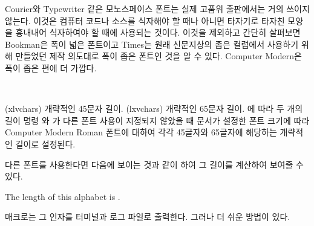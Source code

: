 Courier와 Typewriter 같은 모노스페이스 폰트는 실제 고품위 출판에서는
거의 쓰이지 않는다. 이것은 컴퓨터 코드나 소스를 식자해야 할 때나 아니면
타자기로 타자친 모양을 흉내내어 식자하여야 할 때에 사용되는 것이다.
이것을 제외하고 \tablerefname\를 간단히 살펴보면 Bookman은 폭이 넓은
폰트이고 Times는 원래 신문지상의 좁은 컬럼에서 사용하기 위해 만들었던
제작 의도대로 폭이 좁은 폰트인 것을 알 수 있다. Computer Modern은 
폭이 좁은 편에 더 가깝다.


\begin{syntax}
\lnc{\xlvchars} \lnc{\lxvchars} \\
\end{syntax}
\glossary(xlvchars)%
  {}%
  {개략적인 45문자 길이.}
\glossary(lxvchars)%
  {}%
  {개략적인 65문자 길이.}
에 따라 
두 개의 길이 명령 \lnc{\xlvchars}와 \lnc{\lxvchars}가
다른 폰트 사용이 지정되지 않았을 때 문서가 설정한 폰트 크기에 따라
Computer Modern Roman 폰트에 대하여 각각 45글자와 65글자에 해당하는
개략적인 길이로 설정된다.

다른 폰트를 사용한다면 다음에 보이는 것과 같이 하여 그 길이를
계산하여 보여줄 수 있다.
\begin{lcode}
\newlength{\mylen}                %
\newcommand{\alphabet}{abc...xyz} %
\begingroup                       %
\settowidth{\mylen}{\alphabet}
The length of this alphabet is \the\mylen. %
\endgroup                         %
\end{lcode}
\cmd{\typeout} 매크로는 그 인자를 터미널과 로그 파일로 출력한다.
그러나 더 쉬운 방법이 있다.

